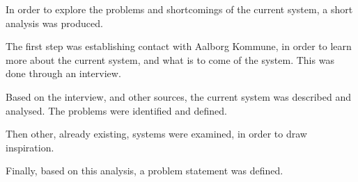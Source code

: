 In order to explore the problems and shortcomings of the current \citybike system, a short analysis was produced.

The first step was establishing contact with Aalborg Kommune, in order to learn more about the current system, and what is to come of the system.
This was done through an interview.

Based on the interview, and other sources, the current system was described and analysed.
The problems were identified and defined.

Then other, already existing, systems were examined, in order to draw inspiration.

Finally, based on this analysis, a problem statement was defined.